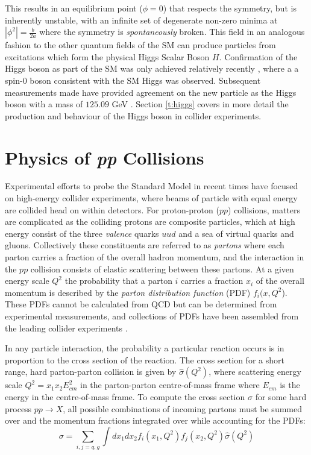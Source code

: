 	This results in an equilibrium point ($\phi=0$) that respects the symmetry, but is inherently unstable, with an infinite set of degenerate non-zero minima at $|\phi^2|=\frac{b}{2a}$ where the symmetry is \textit{spontaneously} broken. This field in an analogous fashion to the other quantum fields of the SM can produce particles from excitations which form the physical Higgs Scalar Boson $H$. Confirmation of the Higgs boson as part of the SM was only achieved relatively recently \cite{higgs-atlas, higgs-cms}, where a a spin-0 boson consistent with the SM Higgs was observed. Subsequent measurements made have provided agreement on the new particle as the Higgs boson with a mass of $125.09$ GeV \cite{pdg}. Section \ref{t:higgs} covers in more detail the production and behaviour of the Higgs boson in collider experiments.


\section{Physics of \textit{pp} Collisions}

	Experimental efforts to probe the Standard Model in recent times have focused on high-energy collider experiments, where beams of particle with equal energy are collided head on within detectors.  For proton-proton ($pp$) collisions, matters are complicated as the colliding protons are composite particles, which at high energy consist of the three \textit{valence} quarks $uud$ and a sea of virtual quarks and gluons. Collectively these constituents are referred to as \textit{partons} where each parton carries a fraction of the overall hadron momentum, and the interaction in the $pp$ collision consists of elastic scattering between these partons. At a given energy scale $Q^2$ the probability that a parton $i$ carries a fraction $x_i$ of the overall momentum is described by the \textit{parton distribution function}  (PDF) $f_i(x, Q^2$). These PDFs cannot be calculated from QCD but can be determined from experimental measurements, and collections of PDFs have been assembled from the leading collider experiments \cite{pdfs}.
	 
	In any particle interaction, the probability a particular reaction occurs is in proportion to the cross section of the reaction. The cross section for a short range, hard parton-parton collision is given by $\hat{\sigma}(Q^2)$, where scattering energy scale $Q^2 = x_1x_2E^2_{cm}$ in the parton-parton centre-of-mass frame where $E_{cm}$ is the energy in the centre-of-mass frame. To compute the cross section $\sigma$ for some hard process $pp\rightarrow X$, all possible combinations of incoming partons must be summed over and the momentum fractions integrated over while accounting for the PDFs:
	\begin{equation}
	\sigma = \sum_{i, j = q, g} \int dx_1dx_2f_i(x_1, Q^2)f_j(x_2, Q^2)\hat{\sigma}(Q^2)
	\end{equation}
	
